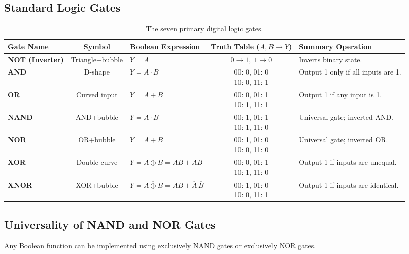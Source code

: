\subsection{Standard Logic Gates}
\begin{table}[htbp]
\centering
\small
\begin{tabularx}{\textwidth}{lclcX}
\toprule
\textbf{Gate Name} & \textbf{Symbol} & \textbf{Boolean Expression} & \textbf{Truth Table ($A, B \rightarrow Y$)} & \textbf{Summary Operation} \\
\midrule
\textbf{NOT (Inverter)} & Triangle+bubble & $Y = \overline{A}$ & $0\rightarrow 1, \; 1\rightarrow 0$ & Inverts binary state. \\
\addlinespace
\textbf{AND} & D-shape & $Y = A \cdot B$ & \makecell{00: 0, 01: 0\\10: 0, 11: 1} & Output 1 only if all inputs are 1. \\
\addlinespace
\textbf{OR} & Curved input & $Y = A + B$ & \makecell{00: 0, 01: 1\\10: 1, 11: 1} & Output 1 if any input is 1. \\
\addlinespace
\textbf{NAND} & AND+bubble & $Y = \overline{A \cdot B}$ & \makecell{00: 1, 01: 1\\10: 1, 11: 0} & Universal gate; inverted AND. \\
\addlinespace
\textbf{NOR} & OR+bubble & $Y = \overline{A + B}$ & \makecell{00: 1, 01: 0\\10: 0, 11: 0} & Universal gate; inverted OR. \\
\addlinespace
\textbf{XOR} & Double curve & $Y = A \oplus B = \overline{A}B + A\overline{B}$ & \makecell{00: 0, 01: 1\\10: 1, 11: 0} & Output 1 if inputs are unequal. \\
\addlinespace
\textbf{XNOR} & XOR+bubble & $Y = \overline{A \oplus B} = AB + \overline{A}\,\overline{B}$ & \makecell{00: 1, 01: 0\\10: 0, 11: 1} & Output 1 if inputs are identical. \\
\bottomrule
\end{tabularx}
\caption{The seven primary digital logic gates.}
\label{tab:logic-gates}
\end{table}

\subsection{Universality of NAND and NOR Gates}
Any Boolean function can be implemented using exclusively NAND gates or exclusively NOR gates.

